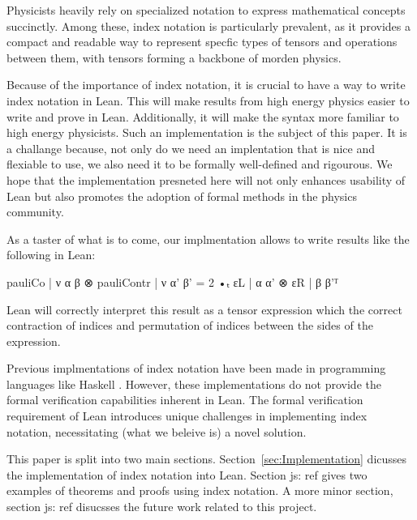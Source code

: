 \documentclass[a4paper, 11pt]{article}
\newcommand{\js}[1]{ {\color{magenta} js:  #1}}
\begin{document}
Physicists heavily rely on specialized notation to express mathematical concepts succinctly. 
Among these, index notation is particularly prevalent,
 as it provides a compact and readable way to represent specfic types of tensors and operations
 between them, with tensors forming a backbone of morden physics. 

Because of the importance of index notation, it is crucial to have a way to write index notation in Lean. 
This will make results from high energy physics easier to write and prove in Lean. 
Additionally, it will make the syntax more familiar to high energy physicists.
Such an implementation is the subject of this paper. 
It is a challange because, not only do we need an implentation that is nice and flexiable to use, 
we also need it to be formally well-defined and rigourous. 
We hope that the implementation presneted here will
not only enhances usability of Lean but also promotes the adoption of formal methods in the 
physics community.


As a taster of what is to come, our implmentation allows to write results like the following in 
Lean:
\begin{code}
{pauliCo | ν α β ⊗ pauliContr | ν α' β' = 2 •ₜ εL | α α' ⊗ εR | β β'}ᵀ
\end{code}
Lean will correctly interpret this result as a tensor expression which the correct contraction of indices 
and permutation of indices between the sides of the expression.

Previous implmentations of index notation have been made in programming languages like Haskell 
\cite{ref}. However, these implementations do not
 provide the formal verification capabilities inherent in Lean. 
 The formal verification requirement of Lean introduces unique challenges in implementing index 
 notation, necessitating (what we beleive is) a novel solution.


This paper is split into two main sections. Section~\ref{sec:Implementation} dicusses 
the implementation of index notation into Lean. Section \js{ref} gives two examples 
of theorems and proofs using index notation. A more minor section, section \js{ref} disucsses 
the future work related to this project.
\end{document}
